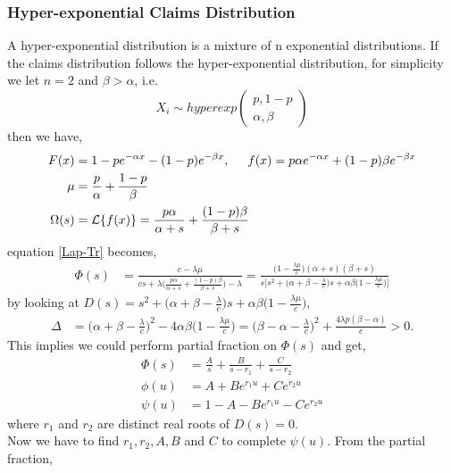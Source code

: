 \documentclass[12pt]{article}
\begin{document}

\subsubsection{Hyper-exponential Claims Distribution}
A hyper-exponential distribution is a mixture of n exponential distributions. If the claims distribution follows the hyper-exponential distribution, for simplicity we let \(n=2\) and \(\beta>\alpha\), i.e. 
\[X_i\sim hyperexp \begin{pmatrix}{p,1-p}\\{\alpha,\beta}\end{pmatrix}\]
then we have,
\begin{align*}
    F(x)&=1-pe^{-\alpha x}-(1-p)e^{-\beta x},
    \hspace{0.5cm}
    f(x)=p\alpha e^{-\alpha x}+(1-p)\beta e^{-\beta x}\\
    \mu&=\frac{p}{\alpha}+\frac{1-p}{\beta}\\
    \Omega(s)&=\mathcal{L}\{f(x)\}=\frac{p\alpha}{\alpha+s}+\frac{(1-p)\beta}{\beta+s}
\end{align*}
equation \eqref{Lap-Tr} becomes,
\begin{align*}
    \Phi(s)&=\frac{c-\lambda\mu}{cs+\lambda\big(\frac{p\alpha}{\alpha+s}+\frac{(1-p)\beta}{\beta+s}\big)-\lambda}=\frac{\big(1-\frac{\lambda\mu}{c}\big)(\alpha+s)(\beta+s)}{s\big[s^2+\big(\alpha+\beta-\frac{\lambda}{c}\big)s+\alpha\beta\big(1-\frac{\lambda\mu}{c}\big)\big]}
\end{align*}
by looking at $\displaystyle D(s)= s^2+\big(\alpha+\beta-\frac{\lambda}{c}\big)s+\alpha\beta\big(1-\frac{\lambda\mu}{c}\big)$, 
\begin{align*}
    \Delta&=\big(\alpha+\beta-\frac{\lambda}{c}\big)^2-4\alpha\beta\big(1-\frac{\lambda\mu}{c}\big)=\big(\beta-\alpha-\frac{\lambda}{c}\big)^2+\frac{4\lambda p(\beta-\alpha)}{c}>0.
\end{align*}
This implies we could perform partial fraction on \(\Phi(s)\) and get,
\begin{align*}
    \Phi(s)&=\frac{A}{s}+\frac{B}{s-r_1}+\frac{C}{s-r_2}\\
    \phi(u)&=A+Be^{r_1u}+Ce^{r_2u}\\
    \psi(u)&=1-A-Be^{r_1u}-Ce^{r_2u}
\end{align*}
where \(r_1\) and \(r_2\) are distinct real roots of \(D(s)=0\).\\
Now we have to find \(r_1, r_2, A, B\) and \(C\) to complete \(\psi(u)\). From the partial fraction,
\end{document}

